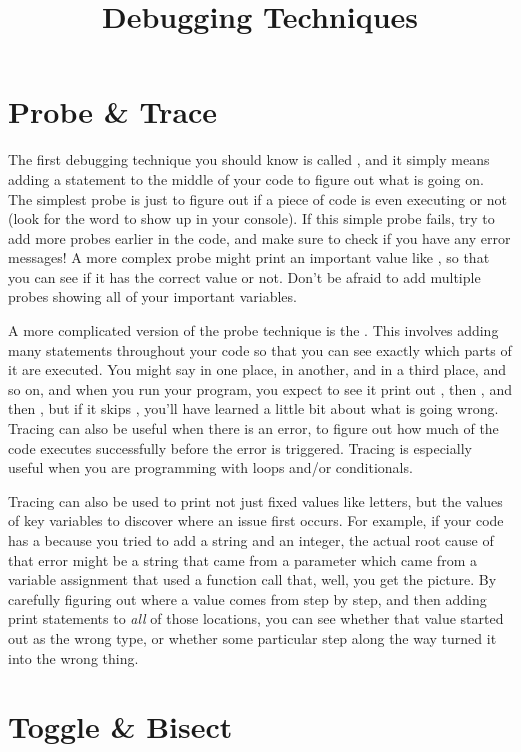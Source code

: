 \documentclass{handout}
\title{Debugging Techniques}
\begin{document}
\section{Probe \& Trace}

The first debugging technique you should know is called , and it simply means adding a  statement to the middle of your code to figure out what is going on. The simplest probe is just  to figure out if a piece of code is even executing or not (look for the word  to show up in your console). If this simple probe fails, try to add more probes earlier in the code, and make sure to check if you have any error messages! A more complex probe might print an important value like , so that you can see if it has the correct value or not. Don't be afraid to add multiple probes showing all of your important variables.

A more complicated version of the probe technique is the . This involves adding many  statements throughout your code so that you can see exactly which parts of it are executed. You might say  in one place,  in another, and  in a third place, and so on, and when you run your program, you expect to see it print out , then , and then , but if it skips , you'll have learned a little bit about what is going wrong. Tracing can also be useful when there is an error, to figure out how much of the code executes successfully before the error is triggered. Tracing is especially useful when you are programming with loops and/or conditionals.

Tracing can also be used to print not just fixed values like letters, but the values of key variables to discover where an issue first occurs. For example, if your code has a  because you tried to add a string and an integer, the actual root cause of that error might be a string that came from a parameter which came from a variable assignment that used a function call that, well, you get the picture. By carefully figuring out where a value comes from step by step, and then adding print statements to \emph{all} of those locations, you can see whether that value started out as the wrong type, or whether some particular step along the way turned it into the wrong thing.

\section{Toggle \& Bisect}
\end{document}
